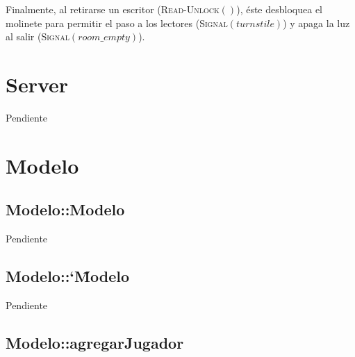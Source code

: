 \documentclass[a4paper,10pt,twoside]{article}
\newcommand{\Fn}[2]{\textsc{#1}$(#2)$}
\begin{document}
Finalmente, al retirarse un escritor (\Fn{Read-Unlock}{}), éste desbloquea el molinete para permitir el paso a los lectores (\Fn{Signal}{turnstile}) y apaga la luz al salir (\Fn{Signal}{room\_empty}). 



\section{Server}

Pendiente




\section{Modelo}


\subsection{Modelo::Modelo}

Pendiente


\subsection{Modelo::\char`\~Modelo}

Pendiente


\subsection{Modelo::agregarJugador}
\end{document}
